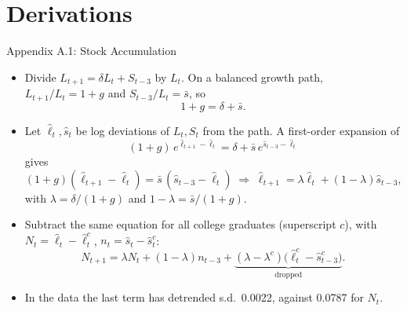 \documentclass[10pt]{beamer}
\begin{document}
\appendix
{}

\section{Derivations}

\begin{frame}{Appendix A.1: Stock Accumulation}
  \small
  \begin{itemize}
    \item Divide $L_{t+1}=\delta L_t+S_{t-3}$ by $L_t$. On a balanced growth path, $L_{t+1}/L_t=1+g$ and $S_{t-3}/L_t=\bar s$, so
      \[ 1+g=\delta+\bar s . \]
    \item Let $\hat\ell_t,\hat s_t$ be log deviations of $L_t,S_t$ from the path. A first-order expansion of
      \[ (1+g)\,e^{\hat\ell_{t+1}-\hat\ell_t}=\delta+\bar s\,e^{\hat s_{t-3}-\hat\ell_t} \]
      gives
      \[ (1+g)(\hat\ell_{t+1}-\hat\ell_t)=\bar s\,(\hat s_{t-3}-\hat\ell_t)
         \;\Longrightarrow\;
         \hat\ell_{t+1}=\lambda\hat\ell_t+(1-\lambda)\hat s_{t-3}, \]
      with $\lambda=\delta/(1+g)$ and $1-\lambda=\bar s/(1+g)$.
    \item Subtract the same equation for all college graduates (superscript $c$), with $N_t=\hat\ell_t-\hat\ell^c_t$, $n_t=\hat s_t-\hat s^c_t$:
      \[ N_{t+1}=\lambda N_t+(1-\lambda)n_{t-3}+\underbrace{(\lambda-\lambda^c)\big(\hat\ell^c_t-\hat s^c_{t-3}\big)}_{\text{dropped}} . \]
    \item In the data the last term has detrended s.d.\ \alert{0.0022}, against 0.0787 for $N_t$.
  \end{itemize}
\end{frame}
\end{document}
